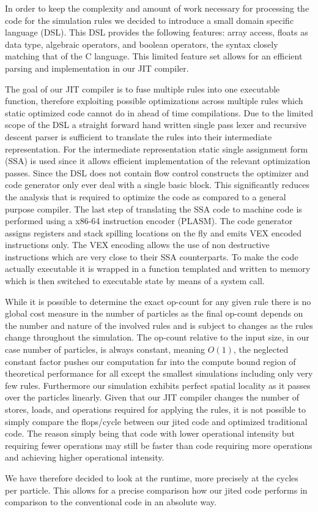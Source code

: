 In order to keep the complexity and amount of work necessary for processing the code for the simulation rules we decided to introduce a small domain specific language (DSL). This DSL provides the following features: array access, floats as data type, algebraic operators, and boolean operators, the syntax closely matching that of the C language. This limited feature set allows for an efficient parsing and implementation in our JIT compiler.

The goal of our JIT compiler is to fuse multiple rules into one executable function, therefore exploiting possible optimizations across multiple rules which static optimized code cannot do in ahead of time compilations. Due to the limited scope of the DSL a straight forward hand written single pass lexer and recursive descent parser is sufficient to translate the rules into their intermediate representation. For the intermediate representation static single assignment form (SSA) is used since it allows efficient implementation of the relevant optimization passes. Since the DSL does not contain flow control constructs the optimizer and code generator only ever deal with a single basic block. This significantly reduces the analysis that is required to optimize the code as compared to a general purpose compiler. The last step of translating the SSA code to machine code is performed using a x86-64 instruction encoder (PLASM). The code generator assigns registers and stack spilling locations on the fly and emits VEX encoded instructions only. The VEX encoding allows the use of non destructive instructions which are very close to their SSA counterparts. To make the code actually executable it is wrapped in a function templated and written to memory which is then switched to executable state by means of a system call.


While it is possible to determine the exact op-count for any given rule there is no global cost measure in the number of particles as the final op-count depends on the number and nature of the involved rules and is subject to changes as the rules change throughout the simulation. The op-count relative to the input size, in our case number of particles, is always constant, meaning $O(1)$, the neglected constant factor pushes our computation far into the compute bound region of theoretical performance for all except the smallest simulations including only very few rules. Furthermore our simulation exhibits perfect spatial locality as it passes over the particles linearly.
Given that our JIT compiler changes the number of stores, loads, and operations required for applying the rules, it is not possible to simply compare the flops/cycle between our jited code and optimized traditional code. The reason simply being that code with lower operational intensity but requiring fewer operations may still be faster than code requiring more operations and achieving higher operational intensity.

We have therefore decided to look at the runtime, more precisely at the cycles per particle. This allows for a precise comparison how our jited code performs in comparison to the conventional code in an absolute way.

